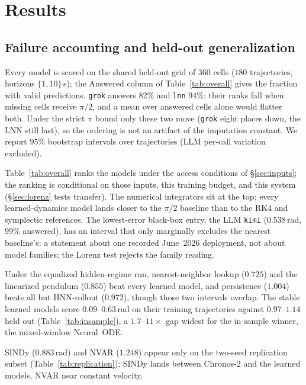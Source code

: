 \documentclass{article}
\begin{document}
\section{Results}
\subsection{Failure accounting and held-out generalization}
\label{sec:reliability}
Every model is scored on the shared held-out grid of $360$ cells ($180$ trajectories, horizons
$\{1,10\}$\,s); the Answered column of Table~\ref{tab:overall} gives the fraction with valid
predictions. \texttt{grok} answers $82\%$ and \texttt{lnn} $94\%$: their ranks fall when
missing cells receive $\pi/2$, and a mean over answered cells alone would flatter both.
Under the strict $\pi$ bound only these two move (\texttt{grok} eight places down, the LNN
still last), so the ordering is not an artifact of the imputation constant.
We report $95\%$ bootstrap intervals over trajectories (LLM per-call variation excluded).

Table~\ref{tab:overall} ranks the models under the access conditions of \S\ref{sec:inputs};
the ranking is conditional on those inputs, this training budget, and this system
(\S\ref{sec:lorenz} tests transfer). The numerical integrators sit at the top;
every learned-dynamics model lands closer to the $\pi/2$ baseline than to the
RK4 and symplectic references. The lowest-error black-box entry, the LLM \texttt{kimi} ($0.538$\,rad, $99\%$
answered), has an interval that only marginally excludes the nearest baseline's: a statement about
one recorded June~2026 deployment, not about model families; the Lorenz test rejects the
family reading.

Under the equalized hidden-regime run, nearest-neighbor lookup ($0.725$) and the
linearized pendulum ($0.855$) beat every learned model, and persistence ($1.004$) beats all
but HNN-rollout ($0.972$), though those two intervals overlap. The stable learned models
score $0.09$--$0.63$\,rad on their training trajectories against $0.97$--$1.14$ held out
(Table~\ref{tab:insample}), a $1.7$--$11\times$ gap widest for the in-sample winner,
the mixed-window Neural~ODE.

SINDy ($0.883$\,rad) and NVAR ($1.248$) appear only on the two-seed replication subset
(Table~\ref{tab:replication}); SINDy lands between Chronos-2 and the learned models, NVAR near
constant velocity.
\end{document}
